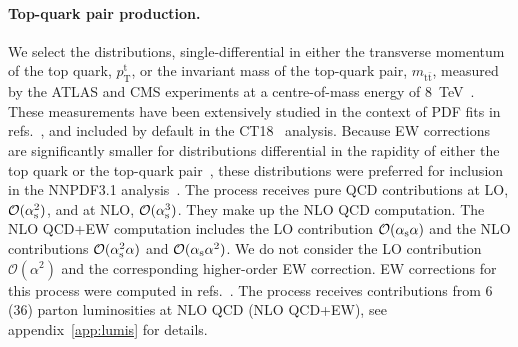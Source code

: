 \paragraph{Top-quark pair production.}
We select the distributions, single-differential in either the transverse
momentum of the top quark, $p_\mathrm{T}^\mathrm{t}$, or the invariant mass of the top-quark
pair, $m_{\mathrm{t}\bar{\mathrm{t}}}$, measured by the ATLAS and CMS experiments at a centre-of-mass
energy of \SI{8}{\tera\electronvolt}~\cite{Aad:2015mbv,Khachatryan:2015oqa}. These measurements have
been extensively studied in the context of PDF fits in
refs.~\cite{Czakon:2016olj,Bailey:2019yze,Amoroso:2020lgh,Kadir:2020yml}, and
included by default in the CT18~\cite{Hou:2019efy} analysis.
Because EW corrections are significantly smaller for distributions differential
in the rapidity of either the top quark or the top-quark
pair~\cite{Czakon:2017wor}, these distributions were preferred for inclusion
in the NNPDF3.1 analysis~\cite{Ball:2017nwa}. The process receives
pure QCD contributions at LO, $\mathcal{O}(\alpha_\mathrm{s}^2)$, and
at NLO, $\mathcal{O}(\alpha_\mathrm{s}^3)$. They make up the NLO QCD
computation. The NLO QCD+EW computation includes the LO contribution
$\mathcal{O}(\alpha_\mathrm{s}\alpha)$ and the NLO contributions
$\mathcal{O}(\alpha_\mathrm{s}^2\alpha)$ and $\mathcal{O}(\alpha_\mathrm{s}\alpha^2)$.
We do not consider the LO contribution $\mathcal{O}(\alpha^2)$ and the
corresponding higher-order EW correction. EW corrections for this process
were computed in refs.~\cite{Bernreuther:2010ny,Hollik:2011ps,Kuhn:2011ri,Bernreuther:2012sx,Pagani:2016caq,Czakon:2017wor,Czakon:2017lgo,Czakon:2017mmr,Czakon:2019bcq,Czakon:2019txp}. The process receives contributions from
6 (36) parton luminosities at NLO QCD (NLO QCD+EW),
see appendix~\ref{app:lumis} for details.

